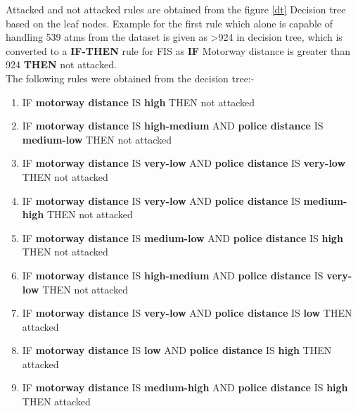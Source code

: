 \documentclass[10pt, conference, compsocconf]{IEEEtran}
\begin{document}
	Attacked and not attacked rules are obtained from the figure \ref{dt} Decision tree based on the leaf nodes. 
	Example for the first rule which alone is capable of handling 539 atms from the dataset is given as \textgreater 924 in decision tree, which is converted to a \textbf{IF-THEN} rule for FIS as \textbf{IF} Motorway distance is greater than 924 \textbf{THEN} not attacked.\\    
	The following rules were obtained from the decision tree:-
	\begin{enumerate}
		\item IF \textbf{motorway distance} IS \textbf{high} THEN not attacked\\
		
		\item IF \textbf{motorway distance} IS \textbf{high-medium} AND \textbf{police distance} IS \textbf{medium-low} THEN not attacked\\
		
		\item IF \textbf{motorway distance} IS \textbf{very-low} AND \textbf{police distance} IS \textbf{very-low} THEN not attacked\\
		
		\item IF \textbf{motorway distance} IS \textbf{very-low} AND \textbf{police distance} IS \textbf{medium-high} THEN not attacked\\
		
		\item IF \textbf{motorway distance} IS \textbf{medium-low} AND \textbf{police distance} IS \textbf{high} THEN not attacked\\
		
		\item IF \textbf{motorway distance} IS \textbf{high-medium} AND \textbf{police distance} IS \textbf{very-low} THEN not attacked\\
		
		\item IF \textbf{motorway distance} IS \textbf{very-low} AND \textbf{police distance} IS \textbf{low} THEN attacked\\
		
		\item IF \textbf{motorway distance} IS \textbf{low} AND \textbf{police distance} IS \textbf{high} THEN attacked\\
		
		\item IF \textbf{motorway distance} IS \textbf{medium-high} AND \textbf{police distance} IS \textbf{high} THEN attacked\\
	\end{enumerate}
\end{document}

